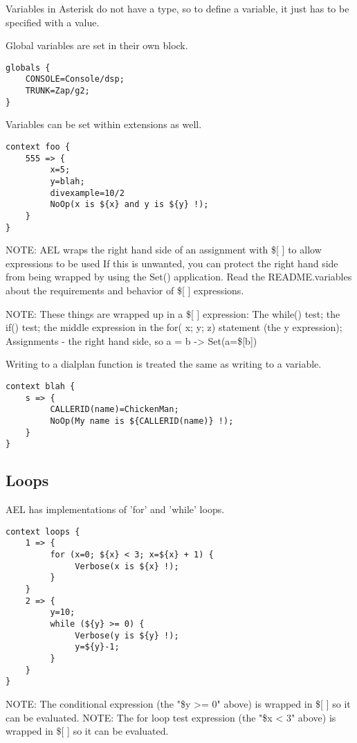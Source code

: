 {Variables in Asterisk do not have a type, so to define a variable, it
just has to be specified with a value.

Global variables are set in their own block.

\begin{verbatim}
globals {
    CONSOLE=Console/dsp;
    TRUNK=Zap/g2;
}
\end{verbatim}


Variables can be set within extensions as well.

\begin{verbatim}
context foo {
    555 => {
         x=5;
         y=blah;
         divexample=10/2
         NoOp(x is ${x} and y is ${y} !);
    }
}
\end{verbatim}

NOTE: AEL wraps the right hand side of an assignment with \$[ ] to allow 
expressions to be used If this is unwanted, you can protect the right hand 
side from being wrapped by using the Set() application. 
Read the README.variables about the requirements and behavior 
of \$[ ] expressions.

NOTE: These things are wrapped up in a \$[ ] expression: The while() test; 
the if() test; the middle expression in the for( x; y; z) statement 
(the y expression); Assignments - the right hand side, so a = b -> Set(a=\$[b])

Writing to a dialplan function is treated the same as writing to a variable.

\begin{verbatim}
context blah {
    s => {
         CALLERID(name)=ChickenMan;
         NoOp(My name is ${CALLERID(name)} !);
    }
} 
\end{verbatim}


\subsection{Loops}

AEL has implementations of 'for' and 'while' loops.

\begin{verbatim}
context loops {
    1 => {
         for (x=0; ${x} < 3; x=${x} + 1) {
              Verbose(x is ${x} !);
         }
    }
    2 => {
         y=10;
         while (${y} >= 0) {
              Verbose(y is ${y} !);
              y=${y}-1;
         }
    }
}
\end{verbatim}

NOTE: The conditional expression (the "\${y} >= 0" above) is wrapped in
      \$[ ] so it can be evaluated.  NOTE: The for loop test expression
      (the "\${x} < 3" above) is wrapped in \$[ ] so it can be evaluated.



}
